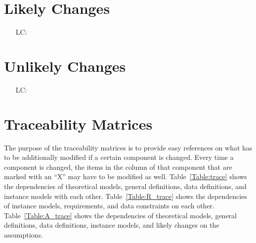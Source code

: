 \documentclass[12pt]{article}
\newcounter{lcnum} %
\begin{document}

\section{Likely Changes}

\noindent\begin{itemize}

    \item[LC\refstepcounter{lcnum}\thelcnum\label{LC_meaningfulLabel}:]

\end{itemize}


\section{Unlikely Changes}

\noindent \begin{itemize}

    \item[LC\refstepcounter{lcnum}\thelcnum\label{LC_meaningfulLabel}:] 

\end{itemize}


\section{Traceability Matrices}

The purpose of the traceability matrices is to provide easy references on what
has to be additionally modified if a certain component is changed.  Every time a
component is changed, the items in the column of that component that are marked
with an ``X'' may have to be modified as well.  Table~\ref{Table:trace} shows
the dependencies of theoretical models, general definitions, data definitions,
and instance models with each other. Table~\ref{Table:R_trace} shows the
dependencies of instance models, requirements, and data constraints on each
other. Table~\ref{Table:A_trace} shows the dependencies of theoretical models,
general definitions, data definitions, instance models, and likely changes on
the assumptions.
\end{document}
